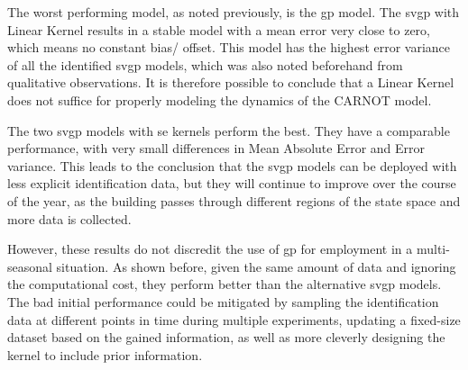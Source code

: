 The worst performing model, as noted previously, is the \acrshort{gp} model. The
\acrshort{svgp} with Linear Kernel results in a stable model with a mean error
very close to zero, which means no constant bias/ offset. This model has the
highest error variance of all the identified \acrshort{svgp} models, which was
also noted beforehand from qualitative observations. It is therefore possible to
conclude that a Linear Kernel does not suffice for properly modeling the
dynamics of the CARNOT model.

The two \acrshort{svgp} models with \acrlong{se} kernels perform the best. They
have a comparable performance, with very small differences in Mean Absolute
Error and Error variance. This leads to the conclusion that the \acrshort{svgp}
models can be deployed with less explicit identification data, but they will
continue to improve over the course of the year, as the building passes through
different regions of the state space and more data is collected.

However, these results do not discredit the use of \acrshort{gp} for employment
in a multi-seasonal situation. As shown before, given the same amount of data
and ignoring the computational cost, they perform better than the alternative
\acrshort{svgp} models. The bad initial performance could be mitigated by
sampling the identification data at different points in time during multiple
experiments, updating a fixed-size dataset based on the gained information, as
well as more cleverly designing the kernel to include prior information.


\clearpage
